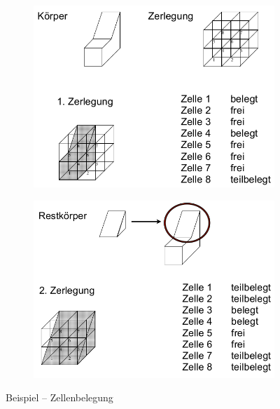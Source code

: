 \begin{figure}[h!]
	\centering
	\begin{subfigure}{.45\textwidth}
		\includegraphics[width=\textwidth]{figures/ch02_zb.png}
	\end{subfigure}
	\begin{subfigure}{.45\textwidth}
		\includegraphics[width=\textwidth]{figures/ch02_zb1.png}
	\end{subfigure}
	\caption{Beispiel -- Zellenbelegung}
	\label{zb}
\end{figure}
